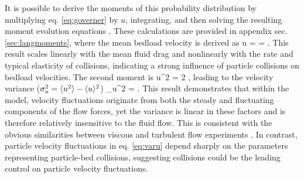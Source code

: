 It is possible to derive the moments of this probability distribution by multiplying eq. \ref{eq:governer} by $u$, integrating, and then solving the resulting moment evolution equations \citep[cf.][]{Cox1965}.
These calculations are provided in appendix sec. \ref{sec:langmoments}, where the mean bedload velocity is derived as
\be \langle u \rangle =  = . \label{eq:meanu}\ee
This result scales linearly with the mean fluid drag and nonlinearly with the rate and typical elasticity of collisions, indicating a strong influence of particle collisions on bedload velocities.
The second moment is
\be \langle u^2 \rangle = 2 , \ee
leading to the velocity variance ($\sigma_u^2 = \langle u^2 \rangle - \langle u \rangle ^2 $)
\be \sigma_u^2 = . \label{eq:varu}\ee
This result demonstrates that within the model, velocity fluctuations originate from both the steady and fluctuating components of the flow forces, yet the variance is linear in these factors and is therefore relatively insensitive to the fluid flow.
This is consistent with the obvious similarities between viscous and turbulent flow experiments \citep[e.g.][]{Charru2004,Lajeunesse2010}.
In contrast, particle velocity fluctuations in eq. \ref{eq:varu} depend sharply on the parameters representing particle-bed collisions, suggesting collisions could be the leading control on particle velocity fluctuations.

